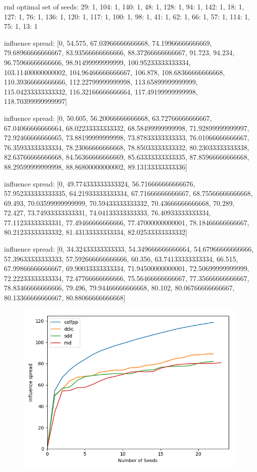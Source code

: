 rnd optimal set of seeds: {29: 1, 104: 1, 140: 1, 48: 1, 128: 1, 94: 1, 142: 1, 18: 1, 127: 1, 76: 1, 136: 1, 120: 1, 117: 1, 100: 1, 98: 1, 41: 1, 62: 1, 66: 1, 57: 1, 114: 1, 75: 1, 13: 1}

influence spread: [0, 54.575, 67.03966666666668, 74.19966666666669, 79.68966666666667, 83.93566666666666, 88.37266666666667, 91.723, 94.234, 96.75966666666666, 98.91499999999999, 100.95233333333334, 103.11400000000002, 104.96466666666667, 106.878, 108.68366666666668, 110.39366666666666, 112.22799999999998, 113.65899999999999, 115.04233333333332, 116.32166666666664, 117.49199999999998, 118.70399999999997]

influence spread: [0, 50.605, 56.20066666666668, 63.72766666666667, 67.04066666666664, 68.02233333333332, 68.58499999999998, 71.92899999999997, 72.92466666666665, 73.88199999999998, 73.87833333333333, 76.01066666666667, 76.35933333333334, 78.23066666666668, 78.85033333333332, 80.23033333333338, 82.63766666666668, 84.56366666666669, 85.63333333333335, 87.85966666666668, 88.29599999999998, 88.86800000000002, 89.13133333333336]

influence spread: [0, 49.774333333333324, 56.716666666666676, 57.952333333333335, 64.21933333333334, 67.71666666666667, 68.75566666666668, 69.493, 70.03599999999999, 70.59433333333332, 70.43666666666668, 70.289, 72.427, 73.74933333333331, 74.04133333333333, 76.40933333333334, 77.11233333333331, 77.49466666666666, 77.47000000000001, 78.18466666666667, 80.21233333333332, 81.43133333333334, 82.02533333333332]

influence spread: [0, 34.32433333333333, 54.349666666666664, 54.67966666666666, 57.39633333333333, 57.592666666666666, 60.356, 63.74133333333334, 66.515, 67.99866666666667, 69.90033333333334, 71.94500000000001, 72.50699999999999, 72.22233333333334, 72.47766666666666, 75.56466666666667, 77.35666666666667, 78.83466666666666, 79.496, 79.94466666666668, 80.102, 80.06766666666667, 80.13366666666667, 80.88066666666668]




\begin{figure}[H]
	\centering
	\includegraphics[scale=0.6]{img/IMG7}
\end{figure}


